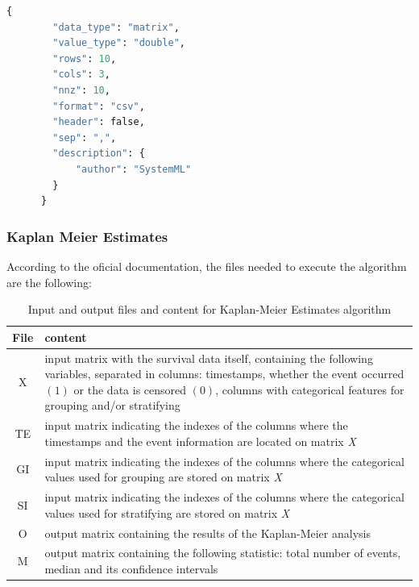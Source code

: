\documentclass[11pt]{article} %
\begin{document}
    \begin{lstlisting}[label=matrix_metadata_file, language=Python, caption=Example of matrix metadata file in JSON format]
      {
        "data_type": "matrix",
        "value_type": "double",
        "rows": 10,
        "cols": 3,
        "nnz": 10,
        "format": "csv",
        "header": false,
        "sep": ",",
        "description": {
            "author": "SystemML"
        }
      }
    \end{lstlisting}

    \subsubsection*{Kaplan Meier Estimates}



      According to the oficial documentation, the files needed to execute the algorithm are the following:

      \begin{table}[!ht]
        \centering
        \begin{tabular}{|c|p{\textwidth}|}
          \hline
            File & content \\ \hline
            X & input matrix with the survival data itself, containing the following variables, separated in columns: timestamps, whether the event occurred $(1)$ or the data is censored $(0)$, columns with categorical features for grouping and/or stratifying \\ \hline
            TE & input matrix indicating the indexes of the columns where the timestamps and the event information are located on matrix \emph{X} \\ \hline
            GI & input matrix indicating the indexes of the columns where the categorical values used for grouping are stored on matrix \emph{X} \\ \hline
            SI & input matrix indicating the indexes of the columns where the categorical values used for stratifying are stored on matrix \emph{X} \\ \hline
            O & output matrix containing the results of the Kaplan-Meier analysis \\ \hline
            M & output matrix containing the following statistic: total number of events, median and its confidence intervals \\ \hline
        \end{tabular}
        \caption{Input and output files and content for Kaplan-Meier Estimates algorithm}
        \label{tab:KM_IO_files}
      \end{table}
\end{document}
